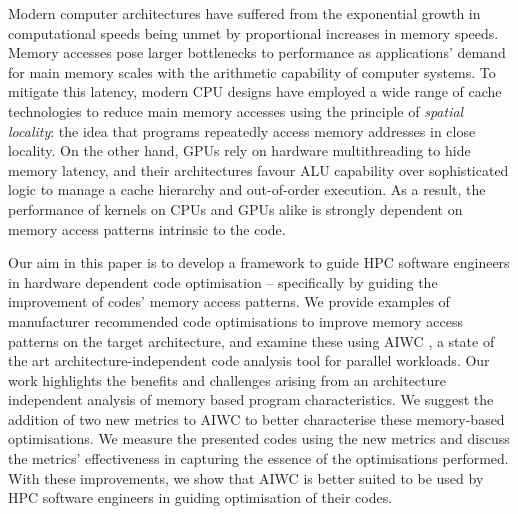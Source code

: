 \documentclass[review=false, sigchi]{acmart}
\begin{document}
	Modern computer architectures have suffered from the exponential growth in computational speeds being unmet by proportional increases in memory speeds\cite{hennessycomparch}. Memory accesses pose larger bottlenecks to performance as applications' demand for main memory scales with the arithmetic capability of computer systems. To mitigate this latency, modern CPU designs have employed a wide range of cache technologies to reduce main memory accesses using the principle of \emph{spatial locality}: the idea that programs repeatedly access memory addresses in close locality. On the other hand, GPUs rely on hardware multithreading to hide memory latency, and their architectures favour ALU capability over sophisticated logic to manage a cache hierarchy and out-of-order execution. As a result, the performance of kernels on CPUs and GPUs alike is strongly dependent on memory access patterns intrinsic to the code. %
	
	
	
	Our aim in this paper is to develop a framework to guide HPC software engineers in hardware dependent code optimisation -- specifically by guiding the improvement of codes' memory access patterns. We provide examples of manufacturer recommended code optimisations to improve memory access patterns on the target architecture, and examine these using AIWC \cite{beauaiwc}, a state of the art architecture-independent code analysis tool for parallel workloads. Our work highlights the benefits and challenges arising from an architecture independent analysis of memory based program characteristics. We suggest the addition of two new metrics to AIWC to better characterise these memory-based optimisations. We measure the presented codes using the new metrics and discuss the metrics' effectiveness in capturing the essence of the optimisations performed. With these improvements, we show that AIWC is better suited to be used by HPC software engineers in guiding optimisation of their codes. 
	
\end{document}
